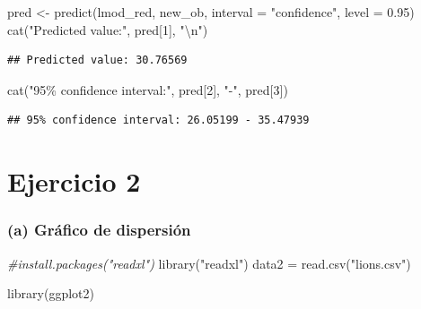 \documentclass[
]{article}
\newenvironment{Shaded}{\begin{snugshade}}{\end{snugshade}}
\newcommand{\AttributeTok}[1]{\textcolor[rgb]{0.77,0.63,0.00}{#1}}
\newcommand{\CommentTok}[1]{\textcolor[rgb]{0.56,0.35,0.01}{\textit{#1}}}
\newcommand{\DecValTok}[1]{\textcolor[rgb]{0.00,0.00,0.81}{#1}}
\newcommand{\FloatTok}[1]{\textcolor[rgb]{0.00,0.00,0.81}{#1}}
\newcommand{\FunctionTok}[1]{\textcolor[rgb]{0.00,0.00,0.00}{#1}}
\newcommand{\NormalTok}[1]{#1}
\newcommand{\OtherTok}[1]{\textcolor[rgb]{0.56,0.35,0.01}{#1}}
\newcommand{\SpecialCharTok}[1]{\textcolor[rgb]{0.00,0.00,0.00}{#1}}
\newcommand{\StringTok}[1]{\textcolor[rgb]{0.31,0.60,0.02}{#1}}
\begin{document}
\begin{Shaded}
\begin{Highlighting}[]
\NormalTok{pred }\OtherTok{\textless{}{-}} \FunctionTok{predict}\NormalTok{(lmod\_red, new\_ob, }\AttributeTok{interval =} \StringTok{"confidence"}\NormalTok{, }\AttributeTok{level =} \FloatTok{0.95}\NormalTok{)}
\FunctionTok{cat}\NormalTok{(}\StringTok{"Predicted value:"}\NormalTok{, pred[}\DecValTok{1}\NormalTok{], }\StringTok{"}\SpecialCharTok{\textbackslash{}n}\StringTok{"}\NormalTok{)}
\end{Highlighting}
\end{Shaded}

\begin{verbatim}
## Predicted value: 30.76569
\end{verbatim}

\begin{Shaded}
\begin{Highlighting}[]
\FunctionTok{cat}\NormalTok{(}\StringTok{"95\% confidence interval:"}\NormalTok{, pred[}\DecValTok{2}\NormalTok{], }\StringTok{"{-}"}\NormalTok{, pred[}\DecValTok{3}\NormalTok{])}
\end{Highlighting}
\end{Shaded}

\begin{verbatim}
## 95% confidence interval: 26.05199 - 35.47939
\end{verbatim}

\hypertarget{ejercicio-2}{%
\section{Ejercicio 2}\label{ejercicio-2}}

\hypertarget{a-gruxe1fico-de-dispersiuxf3n}{%
\subsubsection{(a) Gráfico de
dispersión}\label{a-gruxe1fico-de-dispersiuxf3n}}

\begin{Shaded}
\begin{Highlighting}[]
\CommentTok{\#install.packages("readxl")}
\FunctionTok{library}\NormalTok{(}\StringTok{"readxl"}\NormalTok{)}
\NormalTok{data2 }\OtherTok{=} \FunctionTok{read.csv}\NormalTok{(}\StringTok{"lions.csv"}\NormalTok{)}
\end{Highlighting}
\end{Shaded}

\begin{Shaded}
\begin{Highlighting}[]
\FunctionTok{library}\NormalTok{(ggplot2)}
\end{Highlighting}
\end{Shaded}
\end{document}
